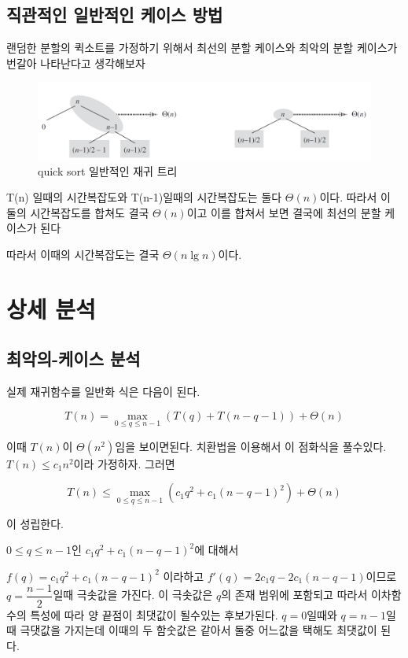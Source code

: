 \documentclass{oblivoir}
\begin{document}
\subsection{직관적인 일반적인 케이스 방법} 

랜덤한 분할의 퀵소트를 가정하기 위해서 최선의 분할 케이스와 최악의 분할 케이스가 번갈아 나타난다고 생각해보자

\begin{figure}[h!]
    \centering
    \includegraphics[scale=0.5]{q3.png}
    \caption{quick sort 일반적인 재귀 트리}
\end{figure}

T(n) 일때의 시간복잡도와 T(n-1)일때의 시간복잡도는 둘다 $\Theta(n)$이다. 따라서 이 둘의 시간복잡도를 합쳐도 결국 $\Theta(n)$이고 이를 합쳐서 보면 결국에 최선의 분할 케이스가 된다 

따라서 이때의 시간복잡도는 결국 $\Theta(n \lg n)$이다.

\section{상세 분석}

\subsection{최악의-케이스 분석 }


실제 재귀함수를 일반화 식은 다음이 된다.

$$T(n) = \max_{0 \le q \le n-1}(T(q) + T(n-q-1)) + \Theta(n)$$

이때 $T(n)$이 $\Theta(n^2)$임을 보이면된다.
치환법을 이용해서 이 점화식을 풀수있다.
$T(n) \le c_1n^2$이라 가정하자. 그러면

$$T(n) \le \max_{0 \le q \le n-1}(c_1q^2 + c_1(n-q-1)^2) + \Theta(n)$$

이 성립한다. 

$0 \le q \le n-1$인 $c_1q^2 + c_1(n-q-1)^2$에 대해서 

$f(q) = c_1q^2 + c_1(n-q-1)^2$ 이라하고 $f'(q) = 2c_1q - 2c_1(n-q-1)$이므로 $q=\dfrac{n-1}{2}$일때 극솟값을 가진다. 이 극솟값은 $q$의 존재 범위에 포함되고 따라서 이차함수의 특성에 따라 양 끝점이 최댓값이 될수있는 후보가된다. $q=0$일때와 $q=n-1$일때 극댓값을 가지는데 이때의 두 함숫값은 같아서 둘중 어느값을 택해도 최댓값이 된다.
\end{document}
